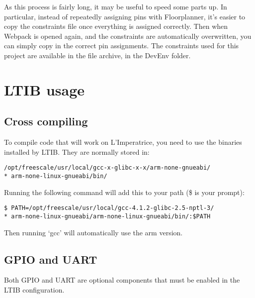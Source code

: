 	As this process is fairly long, it may be useful to speed some parts up.  In particular, instead of repeatedly assigning pins with Floorplanner, it's easier to copy the constraints file once everything is assigned correctly.  Then when Webpack is opened again, and the constraints are automatically overwritten, you can simply copy in the correct pin assignments.  The constraints used for this project are available in the file archive, in the DevEnv folder.



\section{LTIB usage} %
\label{apdx:ltib_usage}

	\subsection{Cross compiling} %
	\label{apdx:cross_compiling}
		To compile code that will work on L'Imperatrice, you need to use the binaries installed by LTIB.  They are normally stored in:

		\texttt{/opt/freescale/usr/local/gcc-x-glibc-x-x/arm-none-gnueabi/\\*
		arm-none-linux-gnueabi/bin/}
		  
		Running the following command will add this to your path (\$ is your prompt):

		\texttt{\$ PATH=/opt/freescale/usr/local/gcc-4.1.2-glibc-2.5-nptl-3/\\*
		arm-none-linux-gnueabi/arm-none-linux-gnueabi/bin/:\$PATH}

		Then running `gcc' will automatically use the arm version.


	\subsection{GPIO and UART} %
	\label{apdx:gpio_and_uart}
		Both GPIO and UART are optional components that must be enabled in the LTIB configuration.  


